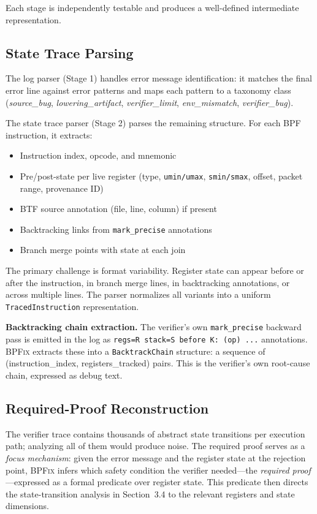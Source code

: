 \documentclass[sigplan,10pt,anonymous,review]{acmart}
\newcommand{\sys}{\textsc{BPFix}\xspace}
\begin{document}
Each stage is independently testable and produces a well-defined intermediate
representation.

\subsection{State Trace Parsing}
\label{sec:state-trace-parsing}

The log parser (Stage 1) handles error message identification: it matches
the final error line against error patterns and maps each pattern to
a taxonomy class (\textit{source\_bug}, \textit{lowering\_artifact},
\textit{verifier\_limit}, \textit{env\_mismatch}, \textit{verifier\_bug}).

The state trace parser (Stage 2) parses the remaining structure.  For each
BPF instruction, it extracts:
\begin{itemize}
  \item Instruction index, opcode, and mnemonic
  \item Pre/post-state per live register (type, \texttt{umin/umax},
        \texttt{smin/smax}, offset, packet range, provenance ID)
  \item BTF source annotation (file, line, column) if present
  \item Backtracking links from \texttt{mark\_precise} annotations
  \item Branch merge points with state at each join
\end{itemize}

The primary challenge is format variability.  Register state can appear before
or after the instruction, in branch merge lines, in backtracking annotations,
or across multiple lines.  The parser normalizes all variants into a uniform
\texttt{TracedInstruction} representation.

\textbf{Backtracking chain extraction.}  The verifier's own
\texttt{mark\_precise} backward pass is emitted in the log as
\texttt{regs=R stack=S before K: (op)~...} annotations.  \sys extracts
these into a \texttt{BacktrackChain} structure: a sequence of
(instruction\_index, registers\_tracked) pairs.  This is the verifier's own
root-cause chain, expressed as debug text.

\subsection{Required-Proof Reconstruction}
\label{sec:required-proof-reconstruction}

The verifier trace contains thousands of abstract state transitions per
execution path; analyzing all of them would produce noise.  The required proof
serves as a \emph{focus mechanism}: given the error message and
the register state at the rejection point, \sys infers which safety
condition the verifier needed---the \emph{required proof}---expressed
as a formal predicate over register state.  This predicate then directs
the state-transition analysis in Section~3.4 to the relevant registers
and state dimensions.
\end{document}
